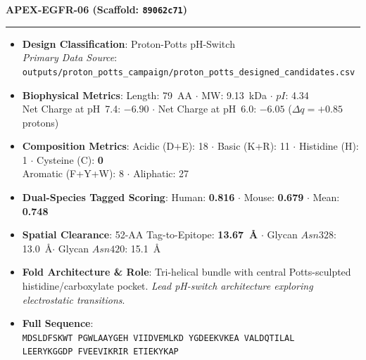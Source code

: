 \documentclass[11pt]{article}
\begin{document}
\noindent\textbf{\color{navyblue}\large APEX-EGFR-06  \quad (Scaffold: \texttt{89062c71})} \\
\vspace{-0.4em}
\rule{\textwidth}{0.6pt}
\vspace{-0.2em}
\begin{itemize}
  \setlength{\itemsep}{2pt}
  \setlength{\parskip}{0pt}
  \item \textbf{Design Classification}: Proton-Potts pH-Switch \\
    \textit{Primary Data Source}: \texttt{\small outputs/proton\_potts\_campaign/proton\_potts\_designed\_candidates.csv}
  \item \textbf{Biophysical Metrics}: Length: 79~AA $\cdot$ MW: 9.13~kDa $\cdot$ $pI$: 4.34 \\
    Net Charge at pH~7.4: $-6.90$ $\cdot$ Net Charge at pH~6.0: $-6.05$ ($\Delta q = +0.85$ protons)
  \item \textbf{Composition Metrics}: Acidic (D+E): 18 $\cdot$ Basic (K+R): 11 $\cdot$ Histidine (H): 1 $\cdot$ Cysteine (C): \textbf{0} \\
    Aromatic (F+Y+W): 8 $\cdot$ Aliphatic: 27
  \item \textbf{Dual-Species Tagged Scoring}: Human: \textbf{0.816} $\cdot$ Mouse: \textbf{0.679} $\cdot$ Mean: \textbf{0.748}
  \item \textbf{Spatial Clearance}: 52-AA Tag-to-Epitope: \textbf{13.67~\AA} $\cdot$ Glycan $Asn328$: 13.0~\AA $\cdot$ Glycan $Asn420$: 15.1~\AA
  \item \textbf{Fold Architecture \& Role}: Tri-helical bundle with central Potts-sculpted histidine/carboxylate pocket. \textit{Lead pH-switch architecture exploring electrostatic transitions}.
  \item \textbf{Full Sequence}: \\
    \texttt{\small MDSLDFSKWT PGWLAAYGEH VIIDVEMLKD YGDEEKVKEA VALDQTILAL \\
    LEERYKGGDP FVEEVIKRIR ETIEKYKAP}
\end{itemize}
\vspace{0.8em}
\end{document}
